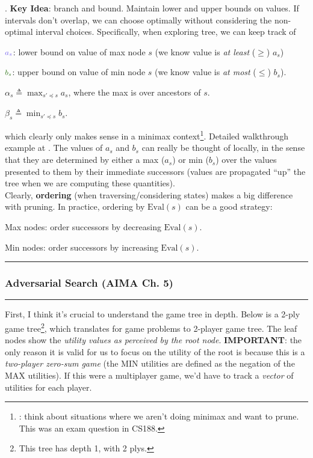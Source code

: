 \documentclass[11pt]{article}
\newcommand\myspace[1][]{\vspace{#1\bigskipamount}\Needspace{10\baselineskip}}
\newcommand\p{\Needspace{10\baselineskip} \noindent}
\newcommand\subsub[1]{\Needspace{15\baselineskip}\hrule\subsubsection{#1}\hrule}
\newcommand\bluesec[1]{\myspace \p \blue{#1}}
\begin{document}
\bluesec{Alpha-Beta Pruning} . \textbf{Key Idea}: branch and bound. Maintain lower and upper bounds on values. If intervals don't overlap, we can choose optimally without considering the non-optimal interval choices. Specifically, when exploring tree, we can keep track of\textellipsis
\begin{compactitem}
	\item $\mblue{a_s}$: lower bound on value of max node $s$ (we know value is \textit{at least} ($\geq$) $a_s$)
	
	\item $\mgreen{b_s}$: upper bound on value of min node $s$ (we know value is \textit{at most} ($\leq$) $b_s$). 
	
	\item $\alpha_s \triangleq \max_{s' \preceq s} a_s$, where the max is over ancestors of $s$. 
	
	\item $\beta_s \triangleq \min_{s' \preceq s} b_s$. 
\end{compactitem}
which clearly only makes sense in a minimax context\footnote{: think about situations where we aren't doing minimax and want to prune. This was an exam question in CS188.}. Detailed walkthrough example at . The values of $a_s$ and $b_s$ can really be thought of locally, in the sense that they are determined by either a max ($a_s$) or min ($b_s$) over the values presented to them by their immediate successors (values are propagated ``up'' the tree when we are computing these quantities). \\

Clearly, \textbf{ordering} (when traversing/considering states) makes a big difference with pruning. In practice, ordering by $\text{Eval}(s)$ can be a good strategy:
\begin{compactitem}
	\item Max nodes: order successors by decreasing $\text{Eval}(s)$.
	\item Min nodes: order successors by increasing $\text{Eval}(s)$. 
\end{compactitem}

\newpage
\subsub{Adversarial Search (AIMA Ch. 5)}

First, I think it's crucial to understand the game tree in depth. Below is a 2-ply game tree\footnote{This tree has depth 1, with 2 plys.}, which translates for game problems to 2-player game tree. The leaf nodes show the \textit{utility values as perceived by the root node}. \textbf{IMPORTANT}: the only reason it is valid for us to focus on the utility of the root is because this is a \textit{two-player zero-sum game} (the MIN utilities are defined as the negation of the MAX utilities). If this were a multiplayer game, we'd have to track a \textit{vector} of utilities for each player. 
\end{document}
